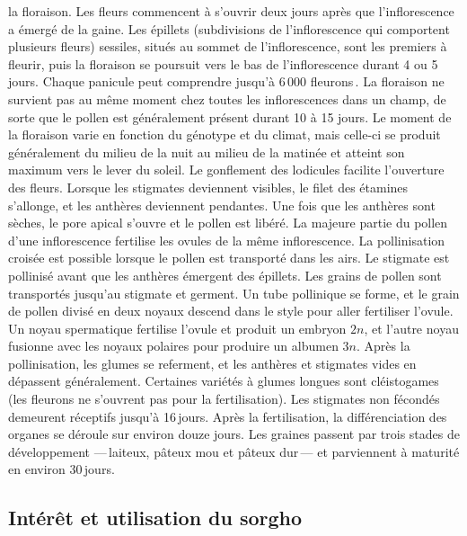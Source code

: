 \documentclass[a4paper,11pt]{article}
\begin{document}
la floraison. Les fleurs commencent à s'ouvrir deux jours après que
l'inflorescence a émergé de la gaine. Les épillets (subdivisions de
l'inflorescence qui comportent plusieurs fleurs) sessiles, situés au
sommet de l'inflorescence, sont les premiers à fleurir, puis la
floraison se poursuit vers le bas de l'inflorescence durant 4 ou 5
jours. Chaque panicule peut comprendre jusqu'à 6\,000
fleurons\,\cite{QUINBYKARPER_1947}. La floraison ne survient pas au
même moment chez toutes les inflorescences dans un champ, de sorte que
le pollen est généralement présent durant 10 à 15 jours. Le moment de
la floraison varie en fonction du génotype et du climat, mais celle-ci
se produit généralement du milieu de la nuit au milieu de la matinée
et atteint son maximum vers le lever du soleil. Le gonflement des
lodicules facilite l'ouverture des fleurs. Lorsque les stigmates
deviennent visibles, le filet des étamines s'allonge, et les anthères
deviennent pendantes. Une fois que les anthères sont sèches, le pore
apical s'ouvre et le pollen est libéré. La majeure partie du pollen
d'une inflorescence fertilise les ovules de la même inflorescence. La
pollinisation croisée est possible lorsque le pollen est transporté
dans les airs. Le stigmate est pollinisé avant que les anthères
émergent des épillets. Les grains de pollen sont transportés jusqu'au
stigmate et germent. Un tube pollinique se forme, et le grain de
pollen divisé en deux noyaux descend dans le style pour aller
fertiliser l'ovule. Un noyau spermatique fertilise l'ovule et produit
un embryon $2n$, et l'autre noyau fusionne avec les noyaux polaires
pour produire un albumen $3n$. Après la pollinisation, les glumes se
referment, et les anthères et stigmates vides en dépassent
généralement. Certaines variétés à glumes longues sont cléistogames
(les fleurons ne s'ouvrent pas pour la fertilisation). Les stigmates
non fécondés demeurent réceptifs jusqu'à 16\,jours. Après la
fertilisation, la différenciation des organes se déroule sur environ
douze jours. Les graines passent par trois stades de développement
---\,laiteux, pâteux mou et pâteux dur\,--- et parviennent à maturité
en environ 30\,jours.

\subsection{Intérêt et utilisation du sorgho}
\end{document}
